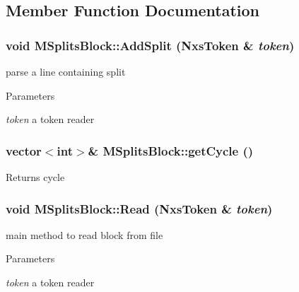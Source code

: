 \subsection{Member Function Documentation}
\hypertarget{classMSplitsBlock_a3f4b4b3afd38d0ddf0dc553836fd9e73}{
\subsubsection[{AddSplit}]{\setlength{\rightskip}{0pt plus 5cm}void MSplitsBlock::AddSplit ({\bf NxsToken} \& {\em token})}}
\label{classMSplitsBlock_a3f4b4b3afd38d0ddf0dc553836fd9e73}
parse a line containing split 
\begin{DoxyParams}{Parameters}
\item[{\em token}]a token reader \end{DoxyParams}
\hypertarget{classMSplitsBlock_a900cb7fe40906072a3cf490ae647c5ce}{
\subsubsection[{getCycle}]{\setlength{\rightskip}{0pt plus 5cm}vector$<$int$>$\& MSplitsBlock::getCycle ()}}
\label{classMSplitsBlock_a900cb7fe40906072a3cf490ae647c5ce}
\begin{DoxyReturn}{Returns}
cycle 
\end{DoxyReturn}
\hypertarget{classMSplitsBlock_a4eb9285aac79a0a29bc0f6be59a4b229}{
\subsubsection[{Read}]{\setlength{\rightskip}{0pt plus 5cm}void MSplitsBlock::Read ({\bf NxsToken} \& {\em token})}}
\label{classMSplitsBlock_a4eb9285aac79a0a29bc0f6be59a4b229}
main method to read block from file 
\begin{DoxyParams}{Parameters}
\item[{\em token}]a token reader \end{DoxyParams}


